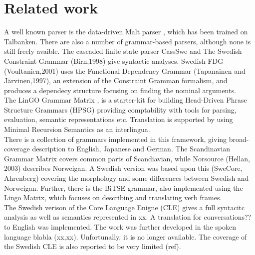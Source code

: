\documentclass{report}
\begin{document}
\section{Related work}
\label{sec:related}
A well known parser is the data-driven Malt parser \cite{malt}, which has been trained on 
Talbanken. 
There are also a number of grammar-based parsers, although none is still freely avaible.
The cascaded finite state parser CassSwe \cite{casswe} and
The Swedish Constraint Grammar (Birn,1998) 
give syntactic analyses. %
Swedish FDG (Voultanien,2001) uses the Functional Dependency Grammar
(Tapanainen and Järvinen,1997), an extension of the Constraint Gramman
formalism, and produces a dependecy structure focusing on finding the nominal
arguments. \\


The LinGO Grammar Matrix \cite{matrix}, is a starter-kit for building Head-Driven Phrase
Structure Grammars \cite{hpsg} (HPSG) providing comptability with tools for
parsing, evaluation, semantic representations etc.
Translation is supported by using Minimal Recursion
Semantics \cite{mrs} as an interlingua. \\
There is a collection of grammars implemented in this framework, giving broad-coverage
description to %
English, Japanese and German. %
The Scandinavian Grammar Matrix \cite{scandmatrix} covers common parts of
Scandiavian, while Norsource (Hellan, 2003) describes Norweigan. A Swedish version
was based upon this (SweCore, Ahrenberg) covering the morphology and some
differences between Swedish and Norweigan. Further, there is the BiTSE \cite{stymne}
grammar, also implemented using the Lingo Matrix,
which focuses on describing and translating verb frames.\\ %


The Swedish verison of the Core Language Enigne (CLE) \cite{gamback} %
gives a full syntacitc analysis as well as semantics represented in xx. A
translation for conversations?? to English was implemented. The work was further developed in the spoken
language blabla (xx,xx). Unfortunally, it is no longer available. The coverage of the Swedish
CLE is also reported to be very limited (ref).\\
\end{document}
